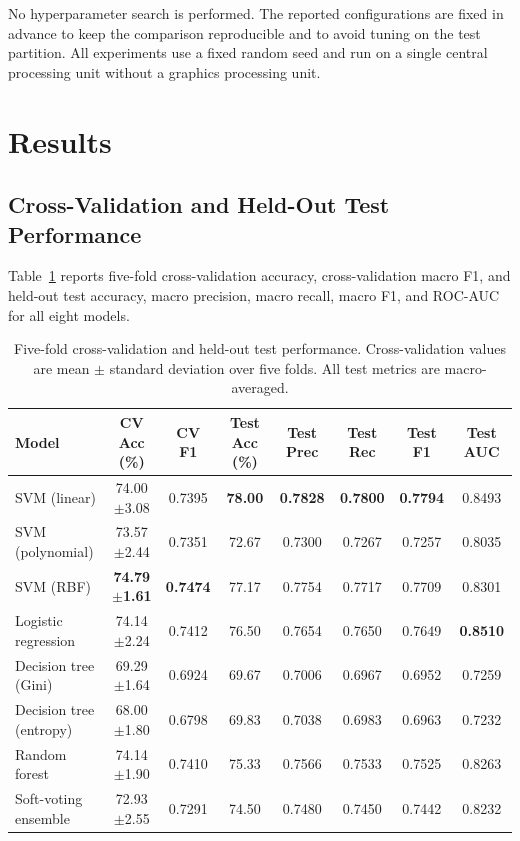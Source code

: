 \documentclass[conference]{IEEEtran}
\begin{document}
No hyperparameter search is performed. The reported configurations are fixed in advance to keep the comparison reproducible and to avoid tuning on the test partition. All experiments use a fixed random seed and run on a single central processing unit without a graphics processing unit.

\section{Results}
\label{sec:results}

\subsection{Cross-Validation and Held-Out Test Performance}

Table~\ref{tab:results} reports five-fold cross-validation accuracy, cross-validation macro F1, and held-out test accuracy, macro precision, macro recall, macro F1, and ROC-AUC for all eight models.

\begin{table}[!t]
\renewcommand{\arraystretch}{1.12}
\setlength{\tabcolsep}{3.5pt}
\caption{Five-fold cross-validation and held-out test performance. Cross-validation values are mean \(\pm\) standard deviation over five folds. All test metrics are macro-averaged.}
\label{tab:results}
\centering
\footnotesize
\begin{tabular}{@{}lccccccc@{}}
\hline
Model & CV Acc (\%) & CV F1 & Test Acc (\%) & Test Prec & Test Rec & Test F1 & Test AUC \\
\hline
SVM (linear) & 74.00\(\pm\)3.08 & 0.7395 & \textbf{78.00} & \textbf{0.7828} & \textbf{0.7800} & \textbf{0.7794} & 0.8493 \\
SVM (polynomial) & 73.57\(\pm\)2.44 & 0.7351 & 72.67 & 0.7300 & 0.7267 & 0.7257 & 0.8035 \\
SVM (RBF) & \textbf{74.79\(\pm\)1.61} & \textbf{0.7474} & 77.17 & 0.7754 & 0.7717 & 0.7709 & 0.8301 \\
Logistic regression & 74.14\(\pm\)2.24 & 0.7412 & 76.50 & 0.7654 & 0.7650 & 0.7649 & \textbf{0.8510} \\
Decision tree (Gini) & 69.29\(\pm\)1.64 & 0.6924 & 69.67 & 0.7006 & 0.6967 & 0.6952 & 0.7259 \\
Decision tree (entropy) & 68.00\(\pm\)1.80 & 0.6798 & 69.83 & 0.7038 & 0.6983 & 0.6963 & 0.7232 \\
Random forest & 74.14\(\pm\)1.90 & 0.7410 & 75.33 & 0.7566 & 0.7533 & 0.7525 & 0.8263 \\
Soft-voting ensemble & 72.93\(\pm\)2.55 & 0.7291 & 74.50 & 0.7480 & 0.7450 & 0.7442 & 0.8232 \\
\hline
\end{tabular}
\end{table}
\end{document}
